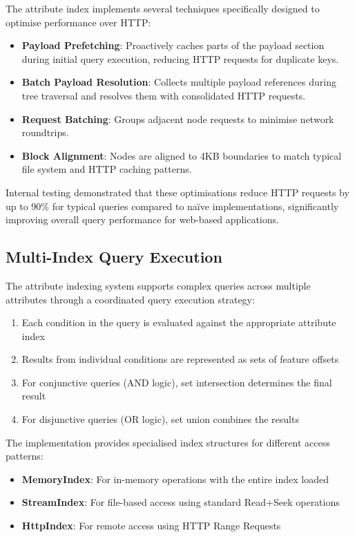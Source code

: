The attribute index implements several techniques specifically designed to optimise performance over HTTP:

\begin{itemize}
    \item \textbf{Payload Prefetching}: Proactively caches parts of the payload section during initial query execution, reducing HTTP requests for duplicate keys.
    \item \textbf{Batch Payload Resolution}: Collects multiple payload references during tree traversal and resolves them with consolidated HTTP requests.
    \item \textbf{Request Batching}: Groups adjacent node requests to minimise network roundtrips.
    \item \textbf{Block Alignment}: Nodes are aligned to 4KB boundaries to match typical file system and HTTP caching patterns.
\end{itemize}

Internal testing demonstrated that these optimisations reduce HTTP requests by up to 90\% for typical queries compared to naïve implementations, significantly improving overall query performance for web-based applications.

\subsection{Multi-Index Query Execution}
\label{methodology:attribute_index:multi_index_query}

The attribute indexing system supports complex queries across multiple attributes through a coordinated query execution strategy:

\begin{enumerate}
    \item Each condition in the query is evaluated against the appropriate attribute index
    \item Results from individual conditions are represented as sets of feature offsets
    \item For conjunctive queries (AND logic), set intersection determines the final result
    \item For disjunctive queries (OR logic), set union combines the results
\end{enumerate}

The implementation provides specialised index structures for different access patterns:

\begin{itemize}
    \item \textbf{MemoryIndex}: For in-memory operations with the entire index loaded
    \item \textbf{StreamIndex}: For file-based access using standard Read+Seek operations
    \item \textbf{HttpIndex}: For remote access using HTTP Range Requests
\end{itemize}

